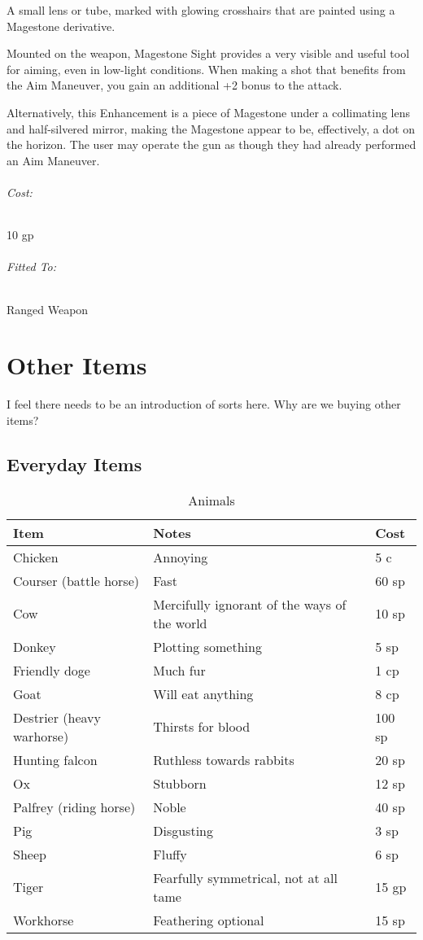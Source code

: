 \documentclass[oneside,11pt,english]{book}
\begin{document}
A small lens or tube, marked with glowing crosshairs that are painted using a Magestone derivative. 

Mounted on the weapon, Magestone Sight provides a very visible and useful tool
for aiming, even in low-light conditions. When making a shot that benefits from
the Aim Maneuver, you gain an additional +2 bonus to the attack. 

Alternatively, this Enhancement is a piece of Magestone under a collimating lens
and half-silvered mirror, making the Magestone appear to be, effectively, a dot
on the horizon. The user may operate the gun as though they had already
performed an Aim Maneuver.  
\vspace{-15pt}\subparagraph{Cost:} 10 gp
\vspace{-15pt}\subparagraph{Fitted To:} Ranged Weapon

\chapter{Other Items}\label{ch:Other Items} %
\startcontents[chapters]
\clearpage

I feel there needs to be an introduction of sorts here. Why are we buying other items?

\section{Everyday Items}
\begin{table}[hb]
  \centering
  \caption{Animals}
  \label{tab:Animals}
  \begin{tabu} spread 0pt {*{3}{X[-1]}}
    Item& Notes &Cost\\\toprule
    Chicken &Annoying &5 c\\
    Courser (battle horse) &Fast &60 sp\\
    Cow &Mercifully ignorant of the ways of the world &10 sp\\
    Donkey &Plotting something &5 sp\\
    Friendly doge &Much fur &1 cp\\
    Goat &Will eat anything &8 cp\\
    Destrier (heavy warhorse) &Thirsts for blood &100 sp\\
    Hunting falcon &Ruthless towards rabbits &20 sp\\
    Ox &Stubborn &12 sp\\
    Palfrey (riding horse) &Noble &40 sp\\
    Pig &Disgusting &3 sp\\
    Sheep &Fluffy &6 sp\\
    Tiger &Fearfully symmetrical, not at all tame &15 gp\\
    Workhorse &Feathering optional &15 sp\\
  \end{tabu}
\end{table}
\end{document}
